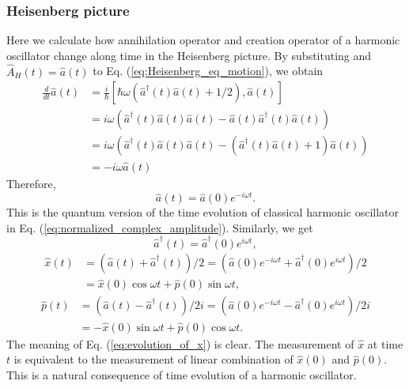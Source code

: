 \documentclass{book}
\begin{document}
\subsubsection{Heisenberg picture}
Here we calculate how annihilation operator and creation operator of a harmonic oscillator change along time in the Heisenberg picture. By substituting  and $\hat A_H(t) = \hat a(t)$ to Eq. (\ref{eq:Heisenberg_eq_motion}), we obtain
\begin{equation}
\begin{aligned}
  \frac{d}{dt}\hat a(t) &= \frac{i}{\hbar}[\hbar\omega(\hat a^\dagger(t)\hat a(t) + 1/2), \hat a(t)]\\
  &= i\omega \left(\hat a^\dagger(t)\hat a(t)\hat a(t)-\hat a(t)\hat a^\dagger(t)\hat a(t)\right)\\
  &= i\omega \left(\hat a^\dagger(t)\hat a(t)\hat a(t)-(\hat a^\dagger(t)\hat a(t)+1)\hat a(t)\right)\\
  &= -i\omega \hat a(t)
\end{aligned}
\end{equation}
Therefore, 
\begin{equation}
  \hat a(t) = \hat a(0)e^{-i\omega t}.
\end{equation}
This is the quantum version of the time evolution of classical harmonic oscillator in Eq. (\ref{eq:normalized_complex_amplitude}). Similarly, we get
\begin{equation}
  \hat a^\dagger(t) = \hat a^\dagger(0)e^{i\omega t},
\end{equation}
\begin{equation}
\begin{aligned}
  \hat x(t) &= (\hat a(t) + \hat a^\dagger(t))/2
  = (\hat a(0)e^{-i\omega t} + \hat a^\dagger(0)e^{i\omega t})/2\\
  &= \hat x(0) \cos\omega t + \hat p(0) \sin \omega t,
  \label{eq:evolution_of_x}
\end{aligned}
\end{equation}
\begin{equation}
\begin{aligned}
  \hat p(t) &= (\hat a(t) - \hat a^\dagger(t))/2i
  = (\hat a(0)e^{-i\omega t} - \hat a^\dagger(0)e^{i\omega t})/2i\\
  &= -\hat x(0) \sin\omega t + \hat p(0) \cos \omega t.
\end{aligned}
\end{equation}
The meaning of Eq. (\ref{eq:evolution_of_x}) is clear. The measurement of $\hat x$ at time $t$ is equivalent to the measurement of linear combination of $\hat x(0)$ and $\hat p(0)$. This is a natural consequence of time evolution of a harmonic oscillator.
\end{document}
